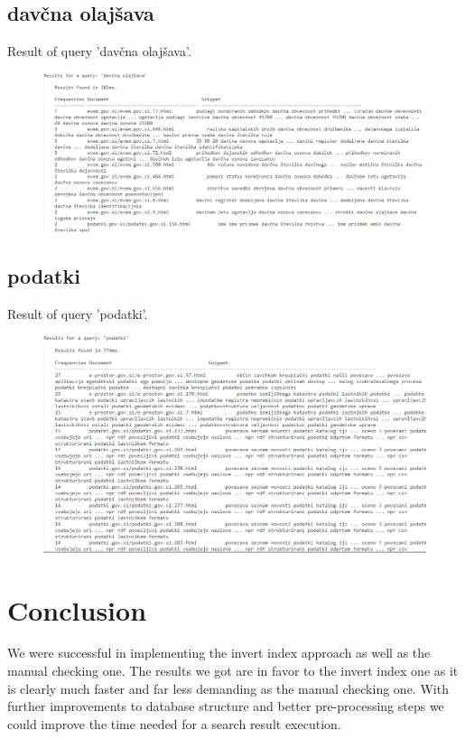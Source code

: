 \documentclass[9pt]{IEEEtran}
\begin{document}
\subsection{davčna olajšava}
Result of query 'davčna olajšava'.
\begin{figure}[ht]
    \centering
    \includegraphics[width=1\columnwidth]{davcna_olajsava.png}

    \label{fig5}
\end{figure}
\clearpage

\subsection{podatki}

Result of query 'podatki'.
\begin{figure}[ht]
    \centering
    \includegraphics[width=1\columnwidth]{podatki.png}

    \label{fig6}
\end{figure}
\clearpage

\twocolumn
\section{Conclusion}

We were successful in implementing the invert index approach as well as the manual checking one.
The results we got are in favor to the invert index one as it is clearly much faster and far less demanding as the manual checking one.
With further improvements to database structure and better pre-processing steps we could improve the time needed for a search result execution.



\end{document}
